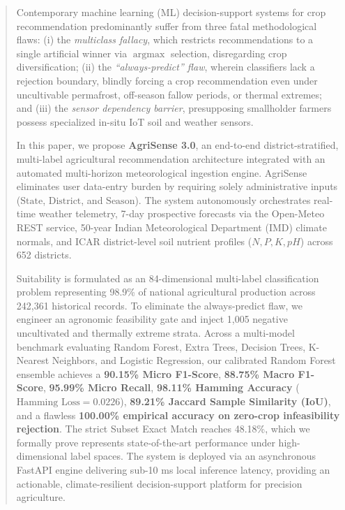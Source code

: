 \documentclass[conference]{IEEEtran}
\begin{document}
\begin{abstract}
Contemporary machine learning (ML) decision-support systems for crop recommendation predominantly suffer from three fatal methodological flaws: (i) the \textit{multiclass fallacy}, which restricts recommendations to a single artificial winner via $\operatorname{argmax}$ selection, disregarding crop diversification; (ii) the \textit{``always-predict'' flaw}, wherein classifiers lack a rejection boundary, blindly forcing a crop recommendation even under uncultivable permafrost, off-season fallow periods, or thermal extremes; and (iii) the \textit{sensor dependency barrier}, presupposing smallholder farmers possess specialized in-situ IoT soil and weather sensors. 

In this paper, we propose \textbf{AgriSense 3.0}, an end-to-end district-stratified, multi-label agricultural recommendation architecture integrated with an automated multi-horizon meteorological ingestion engine. AgriSense eliminates user data-entry burden by requiring solely administrative inputs ($\text{State}$, $\text{District}$, and $\text{Season}$). The system autonomously orchestrates real-time weather telemetry, 7-day prospective forecasts via the Open-Meteo REST service, 50-year Indian Meteorological Department (IMD) climate normals, and ICAR district-level soil nutrient profiles ($N, P, K, pH$) across 652 districts. 

Suitability is formulated as an 84-dimensional multi-label classification problem representing 98.9\% of national agricultural production across 242,361 historical records. To eliminate the always-predict flaw, we engineer an agronomic feasibility gate and inject 1,005 negative uncultivated and thermally extreme strata. Across a multi-model benchmark evaluating Random Forest, Extra Trees, Decision Trees, K-Nearest Neighbors, and Logistic Regression, our calibrated Random Forest ensemble achieves a \textbf{90.15\% Micro F1-Score}, \textbf{88.75\% Macro F1-Score}, \textbf{95.99\% Micro Recall}, \textbf{98.11\% Hamming Accuracy} ($\text{Hamming Loss} = 0.0226$), \textbf{89.21\% Jaccard Sample Similarity (IoU)}, and a flawless \textbf{100.00\% empirical accuracy on zero-crop infeasibility rejection}. The strict Subset Exact Match reaches 48.18\%, which we formally prove represents state-of-the-art performance under high-dimensional label spaces. The system is deployed via an asynchronous FastAPI engine delivering sub-10 ms local inference latency, providing an actionable, climate-resilient decision-support platform for precision agriculture.
\end{abstract}
\end{document}
